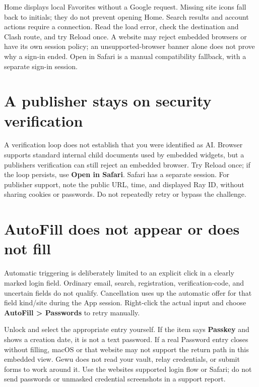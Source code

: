 \documentclass[10pt,letterpaper,oneside]{scrreprt}
\begin{document}
Home displays local Favorites without a Google request. Missing site icons fall back to initials; they do not prevent opening Home. Search results and account actions require a connection. Read the load error, check the destination and Clash route, and try Reload once. A website may reject embedded browsers or have its own session policy; an unsupported-browser banner alone does not prove why a sign-in ended. Open in Safari is a manual compatibility fallback, with a separate sign-in session.

\section{A publisher stays on security verification}\label{a-publisher-stays-on-security-verification}

A verification loop does not establish that you were identified as AI. Browser supports standard internal child documents used by embedded widgets, but a publisher\textquotesingle s verification can still reject an embedded browser. Try Reload once; if the loop persists, use \textbf{Open in Safari}. Safari has a separate session. For publisher support, note the public URL, time, and displayed Ray ID, without sharing cookies or passwords. Do not repeatedly retry or bypass the challenge.

\section{AutoFill does not appear or does not fill}\label{autofill-does-not-appear-or-does-not-fill}

Automatic triggering is deliberately limited to an explicit click in a clearly marked login field. Ordinary email, search, registration, verification-code, and uncertain fields do not qualify. Cancellation uses up the automatic offer for that field kind/site during the App session. Right-click the actual input and choose \textbf{AutoFill \textgreater{} Passwords} to retry manually.

Unlock and select the appropriate entry yourself. If the item says \textbf{Passkey} and shows a creation date, it is not a text password. If a real Password entry closes without filling, macOS or that website may not support the return path in this embedded view. Gewu does not read your vault, relay credentials, or submit forms to work around it. Use the website\textquotesingle s supported login flow or Safari; do not send passwords or unmasked credential screenshots in a support report.
\end{document}

